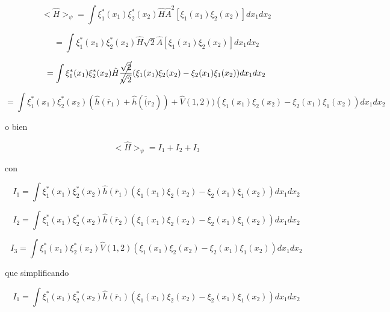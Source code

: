 \documentclass[12pt,a4paper]{article}
\begin{document}
\begin{enumerate}
\begin{enumerate}
    \begin{equation*}
        <\hat{H}>_\psi = \int  \xi_{1}^{*} (x_1) \xi_{2}^{*} (x_2)\hat{H} \hat{A}^2  [\xi_{1} (x_1) \xi_{2} (x_2)] d x_1 dx_2
    \end{equation*}
    
    \begin{equation*}
        = \int  \xi_{1}^{*} (x_1) \xi_{2}^{*} (x_2)\hat{H} \sqrt{2}\hat{A}  [\xi_{1} (x_1) \xi_{2} (x_2)] d x_1 dx_2
    \end{equation*}
    
    \begin{equation*}
        =\int  \xi_{1}^{*} (x_1) \xi_{2}^{*} (x_2)\hat{H}\cancel{ \frac{\sqrt{2}
        }{\sqrt{2}}}(\xi_{1} (x_1) \xi_{2} (x_2) - \xi_{2} (x_1) \xi_{1} (x_2)) d x_1 dx_2
    \end{equation*}
    
    \begin{equation*}
        =\int  \xi_{1}^{*} (x_1) \xi_{2}^{*} (x_2)(\hat{h}(\overline{r}_1) + \hat{h}(\overline(r_2)) + \hat{V}(1,2))(\xi_{1} (x_1) \xi_{2} (x_2) - \xi_{2} (x_1) \xi_{1} (x_2)) d x_1 dx_2
    \end{equation*}
    
    o bien
    
    \begin{equation*}
        <\hat{H}>_\psi = I_1 + I_2 + I_3
    \end{equation*}
    
    con 
    
    \begin{equation*}
        I_1 = \int  \xi_{1}^{*} (x_1) \xi_{2}^{*} (x_2)\hat{h}(\overline{r}_1)(\xi_{1} (x_1) \xi_{2} (x_2) - \xi_{2} (x_1) \xi_{1} (x_2)) d x_1 dx_2
    \end{equation*}
    
    \begin{equation*}
        I_2 = \int  \xi_{1}^{*} (x_1) \xi_{2}^{*} (x_2)\hat{h}(\overline{r}_2) (\xi_{1} (x_1) \xi_{2} (x_2) - \xi_{2} (x_1) \xi_{1} (x_2)) d x_1 dx_2
    \end{equation*}
    
    \begin{equation*}
        I_3 = \int  \xi_{1}^{*} (x_1) \xi_{2}^{*} (x_2) \hat{V}(1,2)(\xi_{1} (x_1) \xi_{2} (x_2) - \xi_{2} (x_1) \xi_{1} (x_2)) d x_1 dx_2
    \end{equation*}
    
    que simplificando
    
    \begin{equation*}
        I_1 = \int  \xi_{1}^{*} (x_1) \xi_{2}^{*} (x_2)\hat{h}(\overline{r}_1)(\xi_{1} (x_1) \xi_{2} (x_2) - \xi_{2} (x_1) \xi_{1} (x_2)) d x_1 dx_2
    \end{equation*}
    

\end{enumerate}
\end{enumerate}
\end{document}
